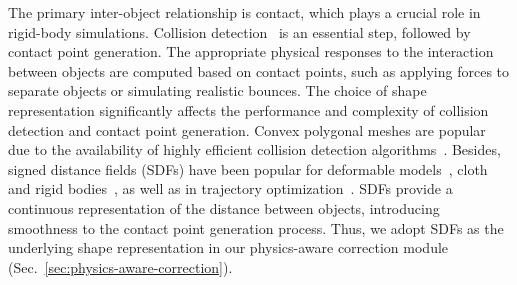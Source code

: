 The primary inter-object relationship is contact, which plays a crucial role in rigid-body simulations. Collision detection~\cite{baraff1994fast,bergen1997efficient,lin1998collision} is an essential step, followed by contact point generation. The appropriate physical responses to the interaction between objects are computed based on contact points, such as applying forces to separate objects or simulating realistic bounces.
The choice of shape representation significantly affects the performance and complexity of collision detection and contact point generation. Convex polygonal meshes are popular due to the availability of highly efficient collision detection algorithms~\cite{gilbert1988fast,van2003collision}. Besides, signed distance fields (SDFs) have been popular for deformable models~\cite{marchal2004collision}, cloth~\cite{bridson2005simulation} and rigid bodies~\cite{guendelman2003nonconvex}, as well as in trajectory optimization~\cite{ratliff2009chomp,WangXF20}. SDFs provide a continuous representation of the distance between objects, introducing smoothness to the contact point generation process.
Thus, we adopt SDFs as the underlying shape representation in our physics-aware correction module (Sec.~\ref{sec:physics-aware-correction}). 
